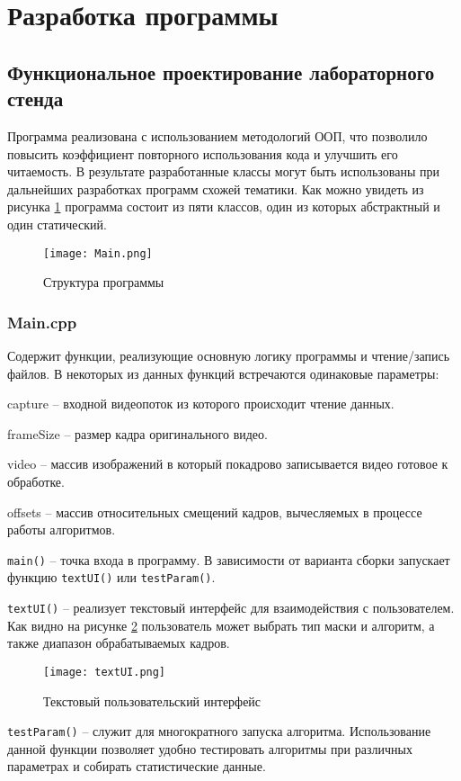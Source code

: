 \section{Разработка программы}
\subsection{Функциональное проектирование лабораторного стенда}
Программа реализована с использованием методологий ООП, что позволило повысить коэффициент повторного использования кода и улучшить его читаемость. В результате разработанные классы могут быть использованы при дальнейших разработках программ схожей тематики. Как можно увидеть из рисунка \ref{fig:uml} программа состоит из пяти классов, один из которых абстрактный и один статический. 
\begin{figure}[h]
    \centering   
    \texttt{[image: Main.png]} 
    \caption{Структура программы}
    \label{fig:uml}
\end{figure} 

\subsubsection{Main.cpp~}
Содержит функции, реализующие основную логику программы и чтение/запись файлов. В некоторых из данных функций встречаются одинаковые параметры:

capture -- входной видеопоток из которого происходит чтение данных.

frameSize -- размер кадра оригинального видео.

video -- массив изображений в который покадрово записывается видео готовое к обработке.

offsets -- массив относительных смещений кадров, вычесляемых в процессе работы алгоритмов.

\texttt{main()} -- точка входа в программу. В зависимости от варианта сборки запускает функцию \texttt{textUI()} или \texttt{testParam()}.

\texttt{textUI()} -- реализует текстовый интерфейс для взаимодействия с пользователем. Как видно на рисунке \ref{fig:textUI} пользователь может выбрать тип маски и алгоритм, а также диапазон обрабатываемых кадров.
\begin{figure}[h]
    \centering   
    \texttt{[image: textUI.png]} 
    \caption{Текстовый пользовательский интерфейс}
    \label{fig:textUI}
\end{figure} 

\texttt{testParam()} -- служит для многократного запуска алгоритма. Использование данной функции позволяет удобно тестировать алгоритмы при различных параметрах и собирать статистические данные. 


